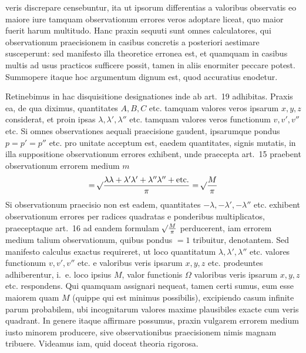 %
veris discrepare censebuntur, ita ut ipsorum differentias a valoribus observatis eo maiore iure tamquam observationum errores veros adoptare liceat, quo maior fuerit harum multitudo. Hanc praxin sequuti sunt omnes calculatores, qui observationum praecisionem in casibus concretis a posteriori aestimare susceperunt: sed manifesto illa theoretice erronea est, et quamquam in casibus multis ad usus practicos sufficere possit, tamen in aliis enormiter peccare potest. Summopere itaque hoc argumentum dignum est, quod accuratius enodetur.

Retinebimus in hac disquisitione designationes inde ab art.\ 19 adhibitas. Praxis ea, de qua diximus, quantitates \(A,B,C\) etc. tamquam valores veros ipsarum \(x,y,z\) considerat, et proin ipsas \(\lambda,\lambda',\lambda''\) etc. tamquam valores veros functionum \(v,v',v''\) etc. Si omnes observationes aequali praecisione gaudent, ipsarumque pondus \(p=p'=p''\) etc. pro unitate acceptum est, eaedem quantitates, signis mutatis, in illa suppositione observationum errores exhibent, unde praecepta art.\ 15 praebent observationum errorem medium \(m\)
\[
=\mathord{{}^{}\!\surd}\frac{\lambda\lambda+\lambda'\lambda'+\lambda''\lambda''+\text{etc.}}{\pi}=\mathord{{}^{}\!\surd}\frac{M}{\pi}
\]
Si observationum praecisio non est eadem, quantitates \(-\lambda,-\lambda',-\lambda''\) etc. exhibent observationum errores per radices quadratas e ponderibus multiplicatos, praeceptaque art.\ 16 ad eandem formulam \(\mathord{{}^{}\!\surd}\frac{M}{\pi}\) perducerent, iam errorem medium talium observationum, quibus pondus \(=1\) tribuitur, denotantem. Sed manifesto calculus exactus requireret, ut loco quantitatum \(\lambda,\lambda',\lambda''\) etc. valores functionum \(v,v',v''\) etc. e valoribus veris ipsarum \(x,y,z\) etc. prodeuntes adhiberentur, i.\ e. loco ipsius \(M\), valor functionis \(\Omega\) valoribus veris ipsarum \(x,y,z\) etc. respondens. Qui quamquam assignari nequeat, tamen certi sumus, eum esse maiorem quam \(M\) (quippe qui est minimus possibilis), excipiendo casum infinite parum probabilem, ubi incognitarum valores maxime plausibiles exacte cum veris quadrant. In genere itaque affirmare possumus, praxin vulgarem errorem medium iusto minorem producere, sive observationibus praecisionem nimis magnam tribuere. Videamus iam, quid doceat theoria rigorosa.

